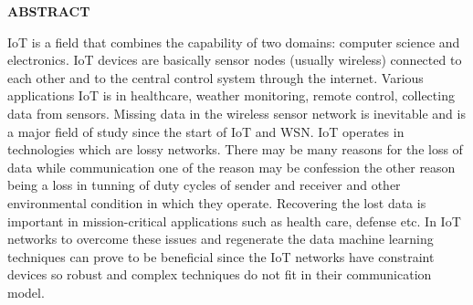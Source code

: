 \thispagestyle{plain}

	\begin{center}
		\Large
		\textbf{ABSTRACT}
	\end{center}
	IoT is a field that combines the capability of two domains: computer science and electronics. IoT devices are basically sensor nodes (usually wireless) connected to each other and to the central control system through the internet. Various applications IoT is in healthcare, weather monitoring, remote control, collecting data from sensors. Missing data in the wireless sensor network is inevitable and is a major field of study since the start of IoT and WSN. IoT operates in technologies which are lossy networks. There may be many reasons for the loss of data while communication one of the reason may be confession the other reason being a loss in tunning of duty cycles of sender and receiver and other environmental condition in which they operate. Recovering the lost data is important in mission-critical applications such as health care, defense etc. In IoT networks to overcome these issues and regenerate the data machine learning techniques can prove to be beneficial since the IoT networks have constraint devices so robust and complex techniques do not fit in their communication model.   \\